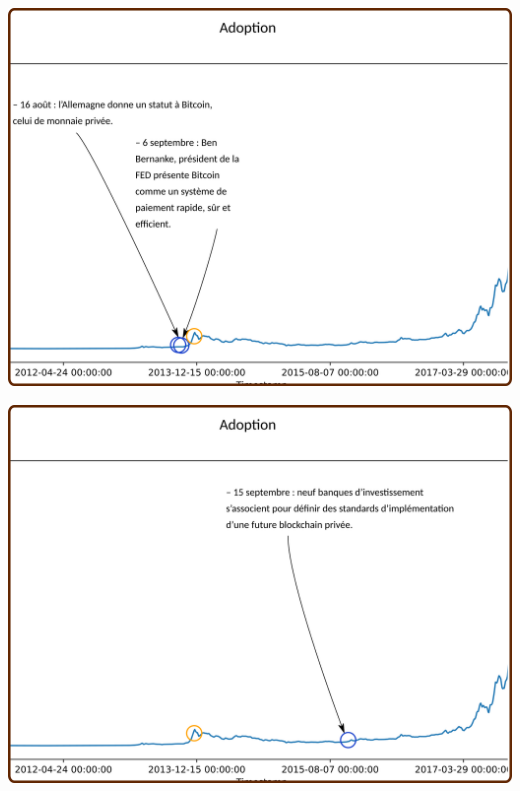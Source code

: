 \documentclass[presentation]{beamer}
\begin{document}
\begin{frame}[label={sec:org6c82bb0}]{}
\begin{center}
\includegraphics[width=.95\textwidth]{./Pictures/Timeline/20adoption.png}
\end{center}
\end{frame}

\begin{frame}[label={sec:org1a5a5f0}]{}
\begin{center}
\includegraphics[width=.95\textwidth]{./Pictures/Timeline/21adoption_blockchain_privee.png}
\end{center}
\end{frame}
\end{document}

